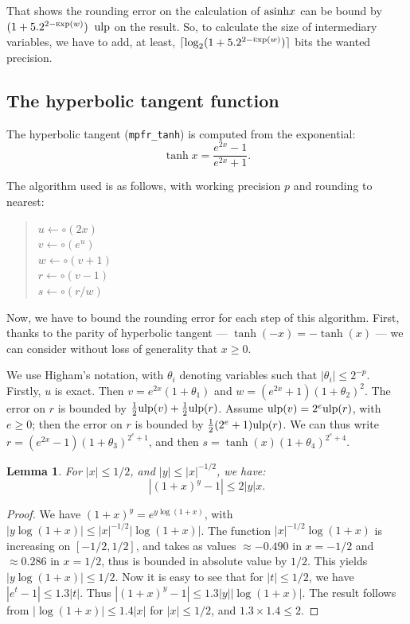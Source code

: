 \documentclass[12pt]{amsart}
\def\n{\textnormal}
\def\ulp{{\rm ulp}}
\def\Exp{{\rm \textsc exp}}
\newtheorem{lemma}{Lemma}
\begin{document}
That shows the rounding error on the calculation of $\n{asinh} x$ can
be bound by $ (1+5.2^{2-\Exp(w)})\;\; \ulp$ on the result. So, to
calculate the size of intermediary variables, we have to add, at
least, $\lceil \log_2 (1+5.2^{2-\Exp(w)}) \rceil$ bits the wanted
precision.

\subsection{The hyperbolic tangent function}

The hyperbolic tangent (\texttt{mpfr\_tanh}) is computed from the exponential:
\[ \tanh x = \frac{ e^{2 x} -1 }{ e^{2 x} +1}. \]

The algorithm used is as follows, with working
precision $p$ and rounding to nearest:
\begin{quote}
$u \leftarrow \circ(2 x)$ \\
$v \leftarrow \circ(e^u)$ \\
$w \leftarrow \circ(v+1)$ \\
$r \leftarrow \circ(v-1)$ \\
$s \leftarrow \circ(r/w)$
\end{quote}
Now, we have to bound the rounding error for each step of this
algorithm.  First, thanks to the parity of hyperbolic tangent
--- $\tanh(-x)=-\tanh(x)$ --- we can consider without loss of generality
that $x \geq 0$.

We use Higham's notation, with $\theta_i$ denoting variables such that
$|\theta_i| \leq 2^{-p}$.
Firstly, $u$ is exact. Then $v = e^{2x} (1+\theta_1)$ and
$w = (e^{2x}+1) (1+\theta_2)^2$.
The error on $r$ is bounded by $\frac{1}{2} \ulp(v) + \frac{1}{2} \ulp(r)$.
Assume $\ulp(v) = 2^e \ulp(r)$, with $e \geq 0$;
then the error on $r$ is bounded by $\frac{1}{2} (2^e+1) \ulp(r)$.
We can thus write $r = (e^{2x}-1) (1+\theta_3)^{2^e+1}$,
and then $s = \tanh(x) (1+\theta_4)^{2^e+4}$.

\begin{lemma}
For $|x| \leq 1/2$, and $|y| \leq |x|^{-1/2}$, we have:
\[ |(1+x)^y-1| \leq 2 |y| x. \]
\end{lemma}
\begin{proof}
We have $(1+x)^y = e^{y \log (1+x)}$,
with $|y \log (1+x)| \leq |x|^{-1/2} |\log (1+x)|$.
The function $|x|^{-1/2} \log (1+x)$ is increasing on $[-1/2,1/2]$, and
takes as values $\approx -0.490$ in $x=-1/2$ and $\approx 0.286$ in $x=1/2$,
thus is bounded in absolute value by $1/2$.
This yields $|y \log (1+x)| \leq 1/2$.
Now it is easy to see that for $|t| \leq 1/2$, we have
$|e^t-1| \leq 1.3 |t|$.
Thus $|(1+x)^y-1| \leq 1.3 |y| |\log (1+x)|$.
The result follows from $|\log (1+x)| \leq 1.4 |x|$ for $|x| \leq 1/2$,
and $1.3 \times 1.4 \leq 2$.
\end{proof}
\end{document}
